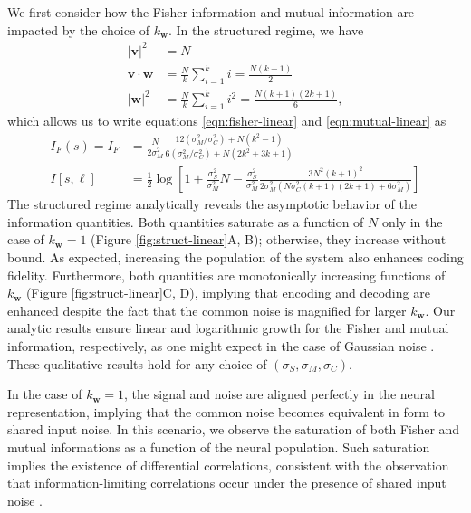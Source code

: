 \documentclass[11pt]{article}
\begin{document}
	We first consider how the Fisher information and mutual information are impacted by the choice of $k_{\mathbf{w}}$. In the structured regime, we have 
	\begin{align}
		|\mathbf{v}|^2 &= N \\
		\mathbf{v}\cdot\mathbf{w} &= \frac{N}{k} \sum_{i=1}^k i = \frac{N(k+1)}{2} \\
		|\mathbf{w}|^2 &= \frac{N}{k}\sum_{i=1}^k i^2 = \frac{N(k+1)(2k+1)}{6},
	\end{align}
	which allows us to write equations \ref{eqn:fisher-linear} and \ref{eqn:mutual-linear} as 
	\begin{align}
		I_F(s) = I_F &= \frac{N}{2\sigma_M^2} \frac{12 (\sigma_M^2/\sigma_C^2) + N  (k^2-1)}{6(\sigma_M^2/\sigma_C^2)+ N(2k^2+3k+1)} \\
		I[s, \boldsymbol{\ell}] &= \frac{1}{2} \log\left[1 + \frac{\sigma_S^2}{\sigma_M^2} N - \frac{\sigma_S^2}{\sigma_M^2}\frac{3N^2(k+1)^2}{2\sigma_M^2 \left(N\sigma_C^2(k+1)(2k+1) + 6 \sigma_M^2\right)}\right]
	\end{align}
	The structured regime analytically reveals the asymptotic behavior of the information quantities. Both quantities saturate as a function of $N$  only in the case of $k_{\mathbf{w}}=1$ (Figure \ref{fig:struct-linear}A, B); otherwise, they increase without bound. As expected, increasing the population of the system also enhances coding fidelity. Furthermore, both quantities are monotonically increasing functions of $k_{\mathbf{w}}$ (Figure \ref{fig:struct-linear}C, D), implying that encoding and decoding are enhanced despite the fact that the common noise is magnified for larger $k_{\mathbf{w}}$. Our analytic results ensure linear and logarithmic growth for the Fisher and mutual information, respectively, as one might expect in the case of Gaussian noise \cite{Brunel1998}. These qualitative results hold for any choice of $(\sigma_S, \sigma_M, \sigma_C)$.
	
	In the case of $k_{\mathbf{w}}=1$, the signal and noise are aligned perfectly in the neural representation, implying that the common noise becomes equivalent in form to shared input noise. In this scenario, we observe the saturation of both Fisher and mutual informations as a function of the neural population. Such saturation implies the existence of differential correlations, consistent with the observation that information-limiting correlations occur under the presence of shared input noise \cite{Moreno-Bote2014}.
	
\end{document}
